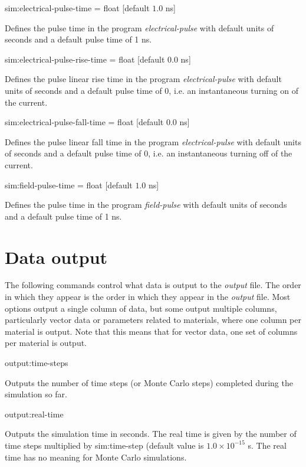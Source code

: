 {\zicf sim:electrical-pulse-time = float [default $1.0$ ns]}
Defines the pulse time in the program \textit{electrical-pulse} with default
units of seconds and a default pulse time of 1 ns.

{\zicf sim:electrical-pulse-rise-time = float [default $0.0$ ns]}
Defines the pulse linear rise time in the program \textit{electrical-pulse} with
 default units of seconds and a default pulse time of 0, i.e. an instantaneous
 turning on of the current.

{\zicf sim:electrical-pulse-fall-time = float [default $0.0$ ns]}
Defines the pulse linear fall time in the program \textit{electrical-pulse} with
 default units of seconds and a default pulse time of 0, i.e. an instantaneous
 turning off of the current.

 {\zicf sim:field-pulse-time = float [default $1.0$ ns]}
 Defines the pulse time in the program \textit{field-pulse} with default
 units of seconds and a default pulse time of 1 ns.

\section*{Data output}
The following commands control what data is output to the \textit{output} file. The order in which they appear is the order in which they appear in the \textit{output} file. Most options output a single column of data, but some output multiple columns, particularly vector data or parameters related to materials, where one column per material is output. Note that this means that for vector data, one set of columns per material is output.

{\zicf output:time-steps} Outputs the number of time steps (or Monte Carlo steps) completed during the simulation so far.

{\zicf output:real-time} Outputs the simulation time in seconds. The real time is given by the number of time steps multiplied by sim:time-step (default value is $1.0 \times 10^{-15}$ s. The real time has no meaning for Monte Carlo simulations.

